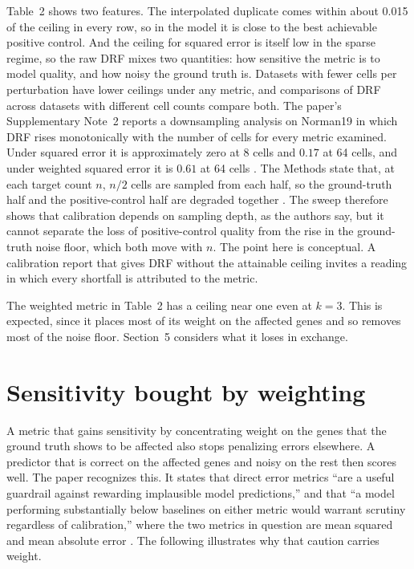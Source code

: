 \documentclass[11pt]{article}
\theoremstyle{definition}
\begin{document}
Table~2 shows two features. The interpolated duplicate comes within about 0.015 of the ceiling in every row, so in the model it is close to the best achievable positive control. And the ceiling for squared error is itself low in the sparse regime, so the raw DRF mixes two quantities: how sensitive the metric is to model quality, and how noisy the ground truth is. Datasets with fewer cells per perturbation have lower ceilings under any metric, and comparisons of DRF across datasets with different cell counts compare both. The paper's Supplementary Note~2 reports a downsampling analysis on Norman19 in which DRF rises monotonically with the number of cells for every metric examined. Under squared error it is approximately zero at 8 cells and $0.17$ at 64 cells, and under weighted squared error it is $0.61$ at 64 cells \citep{miller2026supp}. The Methods state that, at each target count $n$, $n/2$ cells are sampled from each half, so the ground-truth half and the positive-control half are degraded together \citep{miller2026}. The sweep therefore shows that calibration depends on sampling depth, as the authors say, but it cannot separate the loss of positive-control quality from the rise in the ground-truth noise floor, which both move with $n$. The point here is conceptual. A calibration report that gives DRF without the attainable ceiling invites a reading in which every shortfall is attributed to the metric.

The weighted metric in Table~2 has a ceiling near one even at $k=3$. This is expected, since it places most of its weight on the affected genes and so removes most of the noise floor. Section~5 considers what it loses in exchange.

\section{Sensitivity bought by weighting}

A metric that gains sensitivity by concentrating weight on the genes that the ground truth shows to be affected also stops penalizing errors elsewhere. A predictor that is correct on the affected genes and noisy on the rest then scores well. The paper recognizes this. It states that direct error metrics ``are a useful guardrail against rewarding implausible model predictions,'' and that ``a model performing substantially below baselines on either metric would warrant scrutiny regardless of calibration,'' where the two metrics in question are mean squared and mean absolute error \citep{miller2026}. The following illustrates why that caution carries weight.
\end{document}
